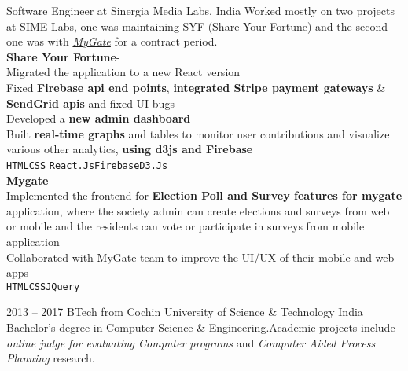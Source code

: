 \documentclass[9pt]{developercv} %
\begin{document}
\begin{entrylist}
		{Software Engineer}
		{at}
		{Sinergia Media Labs.}
		{India}
		{
			Worked mostly on two projects at SIME Labs, one was maintaining SYF (Share Your Fortune) and the second one was with \href{https://www.mygate.com/}{\emph{MyGate}} for a contract period.\smallskip\\
			\textbf{Share Your Fortune}\;-\;{\footnotesize\textcolor{darkgray}{crowdfunding website for social causes.}}\\
  				\faCaretRight\:Migrated the application to a new React version\\
  				\faCaretRight\:Fixed \textbf{Firebase api end points}, \textbf{integrated Stripe payment gateways} \& \textbf{SendGrid apis} and fixed UI bugs\\
  				\faCaretRight\: Developed a \textbf{new admin dashboard}\\
				\faCaretRight\: Built \textbf{real-time graphs} and tables to monitor user contributions and visualize various other analytics, \textbf{using d3js and Firebase}\\
			\texttt{HTML}\slashsep\texttt{CSS}
			\slashsep\texttt{React.Js}\slashsep\texttt{Firebase}\slashsep\texttt{D3.Js}\smallskip\\
			\textbf{Mygate}\;-\;{\footnotesize\textcolor{darkgray}{Security and community management solutions for gated communities.}}\\
  				\faCaretRight\: Implemented the frontend for \textbf{Election Poll and Survey features for mygate} application, where the society admin can create elections and surveys from web or mobile and the residents can vote or participate in surveys from mobile application \\
			\faCaretRight\: Collaborated with MyGate team to improve the UI/UX of their mobile and web apps\\
			\texttt{HTML}\slashsep\texttt{CSS}\slashsep\texttt{JQuery}
		}
\end{entrylist}



\begin{entrylist}
	\entry
		{2013 -- 2017}
		{BTech}
		{from}
		{Cochin University of Science \& Technology}
		{India}
		{Bachelor's degree in Computer Science \& Engineering.Academic projects include \emph{online judge for evaluating Computer programs} and \emph{Computer Aided Process Planning} research.}
	
\end{entrylist}

\smallskip\\


\end{document}
